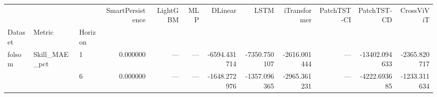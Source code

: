 \begin{tabular}{lllrrrrrrrrr}
\toprule
 &  &  & SmartPersistence & LightGBM & MLP & DLinear & LSTM & iTransformer & PatchTST-CI & PatchTST-CD & CrossViViT \\
Dataset & Metric & Horizon &  &  &  &  &  &  &  &  &  \\
\midrule
\multirow[t]{2}{*}{folsom} & \multirow[t]{2}{*}{Skill_MAE_pct} & 1 & 0.000000 & — & — & -6594.431714 & -7350.750107 & -2616.001444 & — & -13402.094633 & -2365.820717 \\
 &  & 6 & 0.000000 & — & — & -1648.272976 & -1357.096365 & -2965.361231 & — & -4222.693685 & -1233.311634 \\
\cmidrule(lr){1-12} \cmidrule(lr){2-12}
\bottomrule
\end{tabular}
